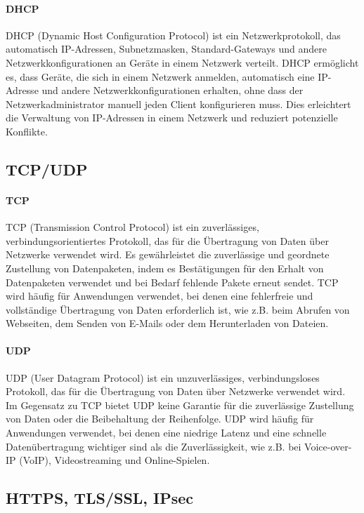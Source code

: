 \paragraph{DHCP}

DHCP (Dynamic Host Configuration Protocol) ist ein Netzwerkprotokoll, das automatisch IP-Adressen, Subnetzmasken, Standard-Gateways und andere Netzwerkkonfigurationen an Geräte in einem Netzwerk verteilt. DHCP ermöglicht es, dass Geräte, die sich in einem Netzwerk anmelden, automatisch eine IP-Adresse und andere Netzwerkkonfigurationen erhalten, ohne dass der Netzwerkadministrator manuell jeden Client konfigurieren muss. Dies erleichtert die Verwaltung von IP-Adressen in einem Netzwerk und reduziert potenzielle Konflikte.

\subsection{TCP/UDP}

\paragraph{TCP}

TCP (Transmission Control Protocol) ist ein zuverlässiges, verbindungsorientiertes Protokoll, das für die Übertragung von Daten über Netzwerke verwendet wird. Es gewährleistet die zuverlässige und geordnete Zustellung von Datenpaketen, indem es Bestätigungen für den Erhalt von Datenpaketen verwendet und bei Bedarf fehlende Pakete erneut sendet. TCP wird häufig für Anwendungen verwendet, bei denen eine fehlerfreie und vollständige Übertragung von Daten erforderlich ist, wie z.B. beim Abrufen von Webseiten, dem Senden von E-Mails oder dem Herunterladen von Dateien.

\paragraph{UDP}

UDP (User Datagram Protocol) ist ein unzuverlässiges, verbindungsloses Protokoll, das für die Übertragung von Daten über Netzwerke verwendet wird. Im Gegensatz zu TCP bietet UDP keine Garantie für die zuverlässige Zustellung von Daten oder die Beibehaltung der Reihenfolge. UDP wird häufig für Anwendungen verwendet, bei denen eine niedrige Latenz und eine schnelle Datenübertragung wichtiger sind als die Zuverlässigkeit, wie z.B. bei Voice-over-IP (VoIP), Videostreaming und Online-Spielen.

\subsection{HTTPS, TLS/SSL, IPsec}

